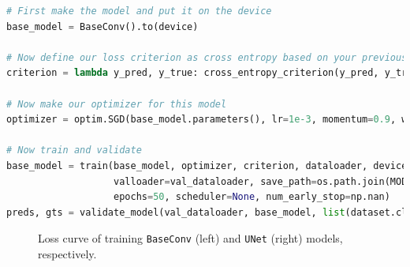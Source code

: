 \documentclass[11pt]{article}
\begin{document}

\begin{lstlisting}[language=Python, basicstyle=\scriptsize]
# First make the model and put it on the device
base_model = BaseConv().to(device)

# Now define our loss criterion as cross entropy based on your previous code
criterion = lambda y_pred, y_true: cross_entropy_criterion(y_pred, y_true, class_weights, device)

# Now make our optimizer for this model
optimizer = optim.SGD(base_model.parameters(), lr=1e-3, momentum=0.9, weight_decay=0.01)

# Now train and validate
base_model = train(base_model, optimizer, criterion, dataloader, device, 
                   valloader=val_dataloader, save_path=os.path.join(MODEL_PATH, str(base_model)),
                   epochs=50, scheduler=None, num_early_stop=np.nan)
preds, gts = validate_model(val_dataloader, base_model, list(dataset.classes), device)
\end{lstlisting}


\begin{figure}[h]
    \centering
    \qquad
    \caption{Loss curve of training \texttt{BaseConv} (left) and \texttt{UNet} (right) models, respectively.}
    \label{fig:loss-BaseConv-UNet]}
\end{figure}
\end{document}
